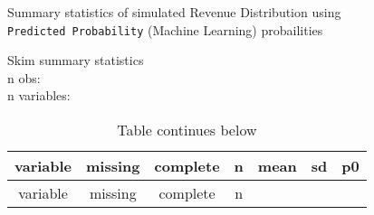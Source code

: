 \documentclass[]{article}
\newenvironment{Shaded}{\begin{snugshade}}{\end{snugshade}}
\newcommand{\KeywordTok}[1]{\textcolor[rgb]{0.13,0.29,0.53}{\textbf{#1}}}
\newcommand{\NormalTok}[1]{#1}
\newcommand{\OperatorTok}[1]{\textcolor[rgb]{0.81,0.36,0.00}{\textbf{#1}}}
\newcommand{\StringTok}[1]{\textcolor[rgb]{0.31,0.60,0.02}{#1}}
\begin{document}
Summary statistics of simulated Revenue Distribution using
\texttt{Predicted\ Probability} (Machine Learning) probailities

\begin{Shaded}
\end{Shaded}

Skim summary statistics\\
n obs:\\
n variables:

\begin{longtable}[]{@{}ccccccc@{}}
\caption{Table continues below}\tabularnewline
\toprule
\begin{minipage}[b]{0.15\columnwidth}\centering
variable\strut
\end{minipage} & \begin{minipage}[b]{0.11\columnwidth}\centering
missing\strut
\end{minipage} & \begin{minipage}[b]{0.12\columnwidth}\centering
complete\strut
\end{minipage} & \begin{minipage}[b]{0.09\columnwidth}\centering
n\strut
\end{minipage} & \begin{minipage}[b]{0.11\columnwidth}\centering
mean\strut
\end{minipage} & \begin{minipage}[b]{0.11\columnwidth}\centering
sd\strut
\end{minipage} & \begin{minipage}[b]{0.11\columnwidth}\centering
p0\strut
\end{minipage}\tabularnewline
\midrule
\endfirsthead
\toprule
\begin{minipage}[b]{0.15\columnwidth}\centering
variable\strut
\end{minipage} & \begin{minipage}[b]{0.11\columnwidth}\centering
missing\strut
\end{minipage} & \begin{minipage}[b]{0.12\columnwidth}\centering
complete\strut
\end{minipage} & \begin{minipage}[b]{0.09\columnwidth}\centering
n\strut
\end{minipage} & \begin{minipage}[b]{0.11\columnwidth}\centering

\end{minipage}
\end{longtable}
\end{document}
